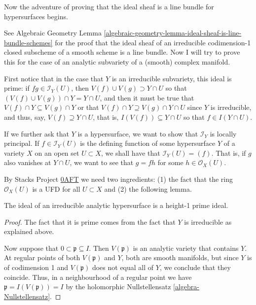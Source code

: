 \medskip\noindent
Now the adventure of proving that the ideal
sheaf is a line bundle for hypersurfaces begins.

See Algebraic Geometry Lemma 
\ref{algebraic-geometry-lemma-ideal-sheaf-is-line-bundle-schemes}
for the proof that the ideal sheaf of an irreducible codimension-1
closed subscheme of a smooth scheme is a line bundle.
Now I will try to prove this for the case of an analytic subvariety
of a (smooth) complex manifold.

First notice that in
the case that $Y$ is an irreducible subvariety,
this ideal is prime: if $fg \in \mathcal{I}_Y(U)$,
then $V(f) \cup  V(g) \supset Y\cap U$ 
so that $(V(f) \cup  V(g))\cap Y = Y\cap U$,
and then it must be true that $V(f)\cap Y\subseteq V(g)\cap Y$
or that $V(f)\cap Y \supseteq V(g)\cap Y \cap U$
since $Y$ is irreducible, and thus, say,
$V(f)\supseteq Y \cap U$,
that is, $I(V(f))\subseteq Y \cap U$
so that $f \in I(Y \cap U)$.

If we further ask that $Y$ is a hypersurface,
we want to show that $\mathcal{I}_Y$ is locally principal.
If $f \in \mathcal{I}_Y(U)$ is the 
defining function of some hypersurface
$Y$ of a variety $X$ on an open set $U \subset X$,
we shall have that $\mathcal{I}_Y(U)=(f)$. 
That is, if $g$ also vanishes at $Y\cap U$,
we want to see that $g = fh$ for some $h \in \mathcal{O}_X(U)$.

By Stacks Project \href{https://stacks.math.columbia.edu/tag/0AFT}{0AFT}
we need two ingredients:
(1) the fact that the ring $\mathcal{O}_X(U)$ is a UFD for all $U \subset X$
and (2) the following lemma.

\begin{lemma}
\label{lemma-ideal-of-irreducible-hypersurface-is-height-1-prime}
The ideal of an irreducible analytic hypersurface is a height-1 prime ideal.
\end{lemma}

\begin{proof} 
The fact that it is prime comes from the fact that $Y$ is
irreducible as explained above.

Now suppose that $0 \subset \mathfrak{p} \subseteq I$.
Then $V(\mathfrak{p})$ is an analytic variety that contains $Y$.
At regular points of both $V(\mathfrak{p})$ and $Y$, 
both are smooth manifolds, but since $Y$ is of codimension 1 and 
$V(\mathfrak{p})$ does not equal all of  $Y$, 
we conclude that they coincide. 
Thus, in a neighbourhood
of a regular point we have $\mathfrak{p}=I(V(\mathfrak{p}))=I$ by the
holomorphic Nullstellensatz \ref{algebra-Nullstellensatz}.
\end{proof}


